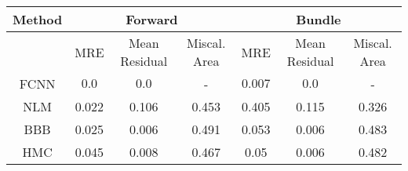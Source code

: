 \documentclass[convert={outext=.png}]{standalone}
\begin{document}
\centering
\label{tab:experimental_results}



\begin{tabular}{c c c c c c c}
\hline
\hline
Method &  \multicolumn{3}{c}{Forward} & \multicolumn{3}{c}{Bundle} \\ \hline
 & MRE & Mean Residual & Miscal. Area & MRE & Mean Residual & Miscal. Area\\
 FCNN & $\mathbf{0.0}$ & $\mathbf{0.0}$ & - & $\mathbf{0.007}$ & $\mathbf{0.0}$ & - \\
 \hline
 NLM & 0.022 & 0.106 & 0.453 & 0.405 & 0.115 & 0.326 \\
 BBB & 0.025 & 0.006 & 0.491 & 0.053 & 0.006 & 0.483 \\
 HMC & 0.045 & 0.008 & 0.467 & 0.05 & 0.006 & 0.482 \\
\hline
\hline
\end{tabular}
\end{document}
